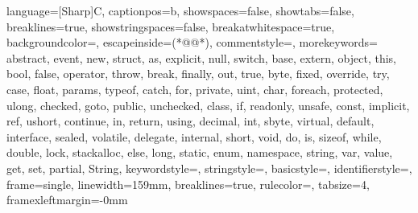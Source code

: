 
\usepackage{listings}
 {
language=[Sharp]C,
captionpos=b,
showspaces=false,
showtabs=false,
breaklines=true,
showstringspaces=false,
breakatwhitespace=true,
backgroundcolor=\color{gray!10},
escapeinside={(*@}{@*)},
commentstyle=\color{greencomments},
morekeywords={  abstract, event, new, struct,
                as, explicit, null, switch,
                base, extern, object, this,
                bool, false, operator, throw,
                break, finally, out, true,
                byte, fixed, override, try,
                case, float, params, typeof,
                catch, for, private, uint,
                char, foreach, protected, ulong,
                checked, goto, public, unchecked,
                class, if, readonly, unsafe,
                const, implicit, ref, ushort,
                continue, in, return, using,
                decimal, int, sbyte, virtual,
                default, interface, sealed, volatile,
                delegate, internal, short, void,
                do, is, sizeof, while,
                double, lock, stackalloc,
                else, long, static,
                enum, namespace, string, var, 
                value, get, set, partial, String},
keywordstyle=\color{bluekeywords},
stringstyle=\color{redstrings},
basicstyle=\ttfamily\small,
identifierstyle=\color{sblue},
frame=single,
linewidth=159mm,
breaklines=true,
rulecolor=\color{black!40},
tabsize=4,
framexleftmargin=-0mm
}




